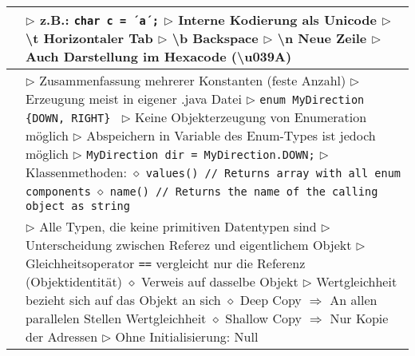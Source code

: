 \begin{tabular}{ | p{} p{} | }
	\makecell[l]{Zeichentyp char} & \makecell[l]{
	$\rhd$ z.B.: \texttt{char c = ´a´;} \\
	$\rhd$ Interne Kodierung als Unicode \\
	$\rhd$ \textbackslash t Horizontaler Tab \\
	$\rhd$ \textbackslash b Backspace \\
	$\rhd$ \textbackslash n Neue Zeile \\
	$\rhd$ Auch Darstellung im Hexacode (\textbackslash u039A)} \\ \hline
	
	\makecell[l]{Enumeration} & \makecell[l]{
	$\rhd$ Zusammenfassung mehrerer Konstanten (feste Anzahl)\\
	$\rhd$ Erzeugung meist in eigener .java Datei \\
	$\rhd$ \texttt{enum MyDirection \{DOWN, RIGHT\} } \\
	$\rhd$ Keine Objekterzeugung von Enumeration möglich \\
	$\rhd$ Abspeichern in Variable des Enum-Types ist jedoch möglich \\
	$\rhd$ \texttt{MyDirection dir = MyDirection.DOWN;} \\
	$\rhd$ Klassenmethoden: \\
	\hspace{0.4cm} $\diamond$ \texttt{values() // Returns array with all enum components} \\
	\hspace{0.4cm} $\diamond$ \texttt{name() // Returns the name of the calling object as string} \\
	 } \\ \hline
	
	\makecell[l]{Referenztypen} & \makecell[l]{
	$\rhd$ Alle Typen, die keine primitiven Datentypen sind \\
	$\rhd$ Unterscheidung zwischen Referez und eigentlichem Objekt \\
	$\rhd$ Gleichheitsoperator \texttt{==} vergleicht nur die Referenz (Objektidentität) \\
	\hspace{0.4cm} $\diamond$ Verweis auf dasselbe Objekt \\
	$\rhd$ Wertgleichheit bezieht sich auf das Objekt an sich \\
	\hspace{0.4cm} $\diamond$ Deep Copy $\Rightarrow$ An allen parallelen Stellen Wertgleichheit \\
	\hspace{0.4cm} $\diamond$ Shallow Copy $\Rightarrow$ Nur Kopie der Adressen \\
	$\rhd$ Ohne Initialisierung: Null} \\ \hline
	\end{tabular}


